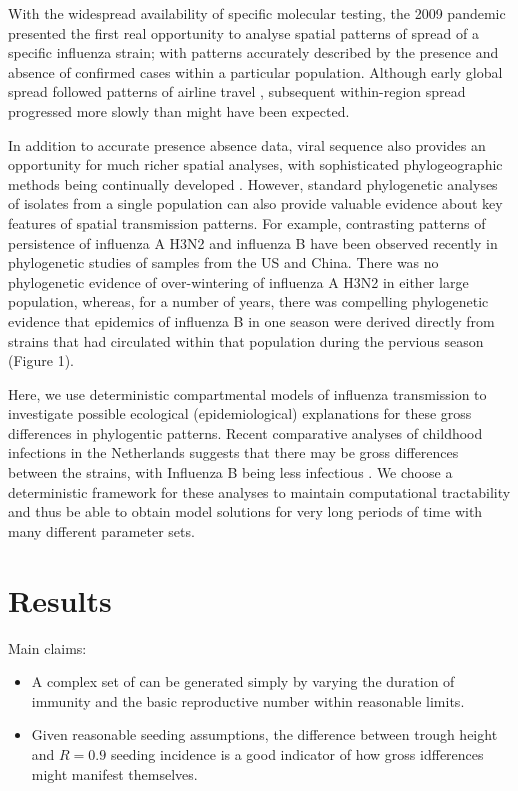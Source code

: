 \documentclass[12pt]{article}
\begin{document}
With the widespread availability of specific molecular testing, the 2009 pandemic presented the first real opportunity to analyse spatial patterns of spread of a specific influenza strain; with patterns accurately described by the presence and absence of confirmed cases within a particular population. Although early global spread followed patterns of airline travel \cite{Fraser:2009p4083,Khan:2009p4285}, subsequent within-region spread progressed more slowly than might have been expected. 

In addition to accurate presence absence data, viral sequence also provides an opportunity for much richer spatial analyses, with sophisticated phylogeographic methods being continually developed \cite{Real:2005p14280}. However, standard phylogenetic analyses of isolates from a single population can also provide valuable evidence about key features of spatial transmission patterns. For example, contrasting patterns of persistence of influenza A H3N2 and influenza B have been observed recently in phylogenetic studies of samples from the US and China. There was no phylogenetic evidence of over-wintering of influenza A H3N2 in either large population, whereas, for a number of years, there was compelling phylogenetic evidence that epidemics of influenza B in one season were derived directly from strains that had circulated within that population during the pervious season (Figure 1).

Here, we use deterministic compartmental models of influenza transmission to investigate possible ecological (epidemiological) explanations for these gross differences in phylogentic patterns. Recent comparative analyses of childhood infections in the Netherlands suggests that there may be gross differences between the strains, with Influenza B being less infectious \cite{Bodewes:2011p14282}. We choose a deterministic framework for these analyses to maintain computational tractability and thus be able to obtain model solutions for very long periods of time with many different parameter sets.  

\section*{Results}
Main claims:
\begin{itemize}
\item A complex set of can be generated simply by varying the duration of immunity and the basic reproductive number within reasonable limits. 
\item Given reasonable seeding assumptions, the difference between trough height and $R=0.9$ seeding incidence is a good indicator of how gross idfferences might manifest themselves.
\end{itemize}
\end{document}
